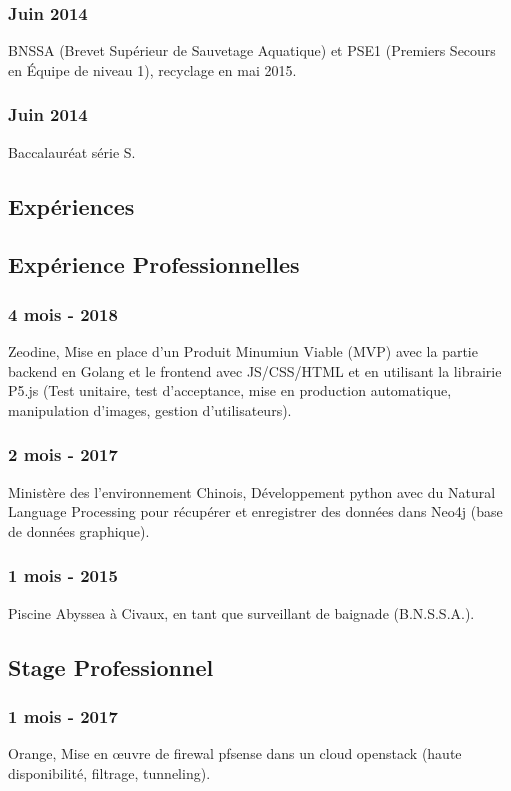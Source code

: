 \documentclass{article}
\begin{document}
        \subsubsection{Juin 2014}
            BNSSA (Brevet Sup\'erieur de Sauvetage Aquatique) et PSE1 (Premiers Secours en \'Equipe de niveau 1), recyclage en mai 2015.
        \subsubsection{Juin 2014}
            Baccalaur\'eat s\'erie S.

    \vspace{1cm}

    \begin{multicols}{2}
        \section{Exp\'eriences}
            \subsection{Exp\'erience Professionnelles}
                \subsubsection{4 mois - 2018}
                    Zeodine, Mise en place d'un Produit Minumiun Viable (MVP) avec la partie backend en Golang et le frontend avec JS/CSS/HTML et en utilisant la librairie P5.js (Test unitaire, test d'acceptance, mise en production automatique, manipulation d'images, gestion d'utilisateurs).
                \subsubsection{2 mois - 2017}
                    Minist\`ere des l'environnement Chinois, D\'eveloppement python avec du Natural Language Processing pour r\'ecup\'erer et enregistrer des donn\'ees dans Neo4j (base de donn\'ees graphique).
                \subsubsection{1 mois - 2015}
                    Piscine Abyssea \`a Civaux, en tant que surveillant de baignade (B.N.S.S.A.).
            \subsection{Stage Professionnel}
                \subsubsection{1 mois - 2017}
                    Orange, Mise en \oe{}uvre de firewal pfsense dans un cloud openstack (haute disponibilit\'e, filtrage, tunneling).

\end{multicols}
\end{document}

